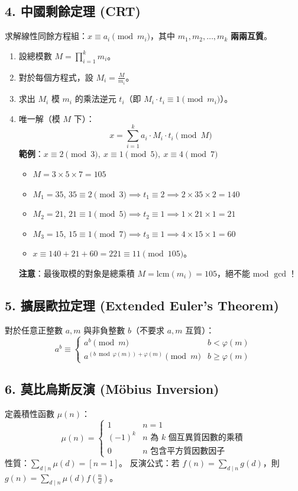 \subsection*{4. 中國剩餘定理 (CRT)}
求解線性同餘方程組：$x \equiv a_i \pmod{m_i}$，其中 $m_1, m_2, \dots, m_k$ \textbf{兩兩互質}。
\begin{enumerate}
    \item 設總模數 $M = \prod_{i=1}^k m_i$。
    \item 對於每個方程式，設 $M_i = \frac{M}{m_i}$。
    \item 求出 $M_i$ 模 $m_i$ 的乘法逆元 $t_i$（即 $M_i \cdot t_i \equiv 1 \pmod{m_i}$）。
    \item 唯一解（模 $M$ 下）：
    $$x = \sum_{i=1}^k a_i \cdot M_i \cdot t_i \pmod M$$
    \textbf{範例}：$x \equiv 2 \pmod 3,\ x \equiv 1 \pmod 5,\ x \equiv 4 \pmod 7$
    \begin{itemize}
        \item $M = 3 \times 5 \times 7 = 105$
        \item $M_1 = 35$, $35 \equiv 2 \pmod 3 \implies t_1 \equiv 2 \implies 2 \times 35 \times 2 = 140$
        \item $M_2 = 21$, $21 \equiv 1 \pmod 5 \implies t_2 \equiv 1 \implies 1 \times 21 \times 1 = 21$
        \item $M_3 = 15$, $15 \equiv 1 \pmod 7 \implies t_3 \equiv 1 \implies 4 \times 15 \times 1 = 60$
        \item $x \equiv 140 + 21 + 60 = 221 \equiv 11 \pmod{105}$。
    \end{itemize}
    \textbf{注意}：最後取模的對象是總乘積 $M = \text{lcm}(m_i) = 105$，絕不能 mod $\gcd$！
\end{enumerate}

\subsection*{5. 擴展歐拉定理 (Extended Euler's Theorem)}
對於任意正整數 $a, m$ 與非負整數 $b$（不要求 $a, m$ 互質）：
$$
a^b \equiv
\begin{cases}
a^b \pmod m & b < \varphi(m) \\
a^{(b \bmod \varphi(m)) + \varphi(m)} \pmod m & b \ge \varphi(m)
\end{cases}
$$

\subsection*{6. 莫比烏斯反演 (Möbius Inversion)}
定義積性函數 $\mu(n)$：
$$
\mu(n) =
\begin{cases}
1 & n = 1 \\
(-1)^k & n \text{ 為 } k \text{ 個互異質因數的乘積} \\
0 & n \text{ 包含平方質因數因子}
\end{cases}
$$
性質：$\sum_{d \mid n} \mu(d) = [n = 1]$。
反演公式：若 $f(n) = \sum_{d \mid n} g(d)$，則 $g(n) = \sum_{d \mid n} \mu(d) f(\frac{n}{d})$。
